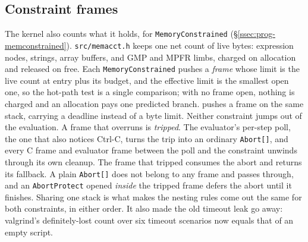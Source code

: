 
\subsection*{Constraint frames}

The kernel also counts what it holds, for \texttt{MemoryConstrained}
(\S\ref{ssec:prog-memconstrained}). \texttt{src/memacct.h} keeps one net count of live
bytes: expression nodes, strings, array buffers, and GMP and MPFR limbs, charged on
allocation and released on free. Each \texttt{MemoryConstrained} pushes a \emph{frame}
whose limit is the live count at entry plus its budget, and the effective limit is the
smallest open one, so the hot-path test is a single comparison; with no frame open,
nothing is charged and an allocation pays one predicted branch.  pushes a frame on the same stack, carrying a deadline
instead of a byte limit. Neither constraint jumps out of the evaluation. A frame that
overruns is \emph{tripped}. The evaluator's per-step poll, the one that also notices
Ctrl-C, turns the trip into an ordinary \texttt{Abort[]}, and every C frame and
evaluator frame between the poll and the constraint unwinds through its own cleanup.
The frame that tripped consumes the abort and returns its fallback. A plain
\texttt{Abort[]} does not belong to any frame and passes through, and an
\texttt{AbortProtect} opened \emph{inside} the tripped frame defers the abort until it
finishes. Sharing one stack is what makes the nesting rules come out the same for both
constraints, in either order. It also made the old timeout leak go away: valgrind's
definitely-lost count over six timeout scenarios now equals that of an empty script.


